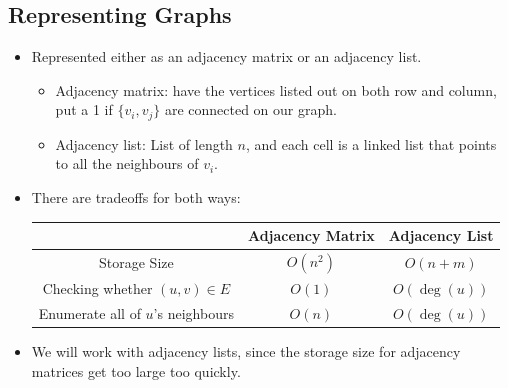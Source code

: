 \documentclass[10pt]{article}
\begin{document}
	\subsection{Representing Graphs}
	\begin{itemize}
		\item Represented either as an adjacency matrix or an adjacency list.  
			\begin{itemize}
				\item Adjacency matrix: have the vertices listed out on both row and column, put a 1 if 
					$\{v_i, v_j\}$ are connected on our graph.
				\item Adjacency list: List of length $n$, and each cell is a linked list that points 
					to all the neighbours of $v_i$.
			\end{itemize}
		\item There are tradeoffs for both ways:
			\begin{center}
				\begin{tabular}{c|c|c}
			& 	\textbf{Adjacency Matrix} & \textbf{Adjacency List}\\
			\hline
					Storage Size  & $O(n^2)$  & $O(n + m)$\\
				Checking whether $(u, v) \in E$ & $O(1)$ & $O(\deg(u))$\\
				Enumerate all of $u$'s neighbours &  $O(n)$ & $O(\deg(u))$
				\end{tabular}
			\end{center} 
		\item We will work with adjacency lists, since the storage size for adjacency matrices get
			too large too quickly. 
	\end{itemize}
\end{document}
